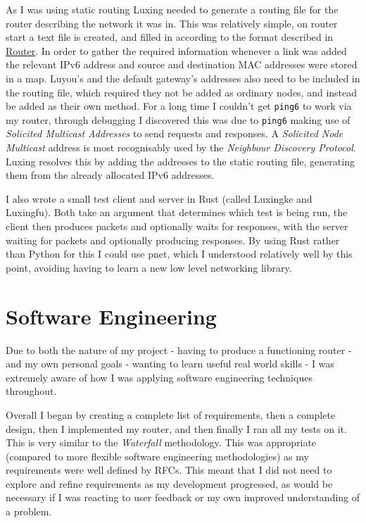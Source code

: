 \documentclass[12pt,a4paper,twoside,openright]{report}
\begin{document}
As I was using static routing Luxing needed to generate a routing file for the router describing the network it was in.  This was relatively simple, on router start a text file is created, and filled in according to the format described in \hyperref[sec::router]{Router}.  In order to gather the required information whenever a link was added the relevant IPv6 address and source and destination MAC addresses were stored in a map.  Luyou's and the default gateway's addresses also need to be included in the routing file, which required they not be added as ordinary nodes, and instead be added as their own method. For a long time I couldn't get \verb!ping6! to work via my router, through debugging I discovered this was due to \verb!ping6! making use of \textit{Solicited Multicast Addresses} to send requests and responses. A \textit{Solicited Node Multicast} address is most recognisably used by the \textit{Neighbour Discovery Protocol}\cite{ndp_rfc}. Luxing resolves this by adding the addresses to the static routing file, generating them from the already allocated IPv6 addresses.

\bigskip

I also wrote a small test client and server in Rust (called Luxingke and Luxingfu).  Both take an argument that determines which test is being run, the client then produces packets and optionally waits for responses, with the server waiting for packets and optionally producing responses.  By using Rust rather than Python for this I could use pnet, which I understood relatively well by this point, avoiding having to learn a new low level networking library.

\section{Software Engineering}
\label{sec::soft_eng}

Due to both the nature of my project - having to produce a functioning router - and my own personal goals - wanting to learn useful real world skills - I was extremely aware of how I was applying software engineering techniques throughout.

\bigskip

Overall I began by creating a complete list of requirements, then a complete design, then I implemented my router, and then finally I ran all my tests on it.  This is very similar to the \textit{Waterfall} methodology.  This was appropriate (compared to more flexible software engineering methodologies) as my requirements were well defined by RFCs. This meant that I did not need to explore and refine requirements as my development progressed, as would be necessary if I was reacting to user feedback or my own improved understanding of a problem.
\end{document}
